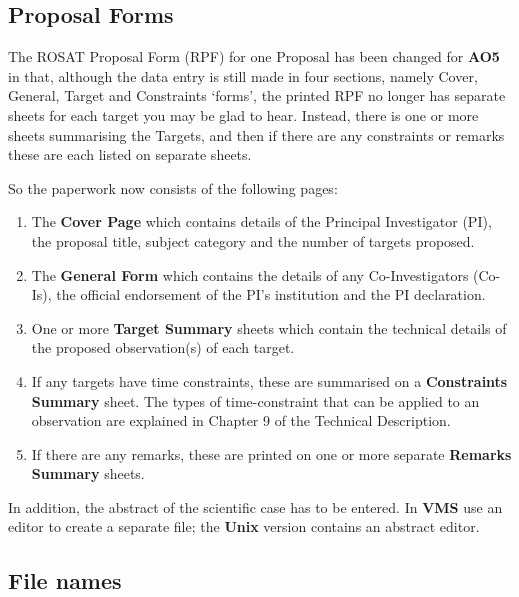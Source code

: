 \subsection{Proposal Forms}
\label{sse:forms}

The ROSAT Proposal Form (RPF) for one Proposal has been changed for
{\bf AO5} in that, although the data entry is still made in four
sections, namely Cover, General, Target and Constraints `forms', the
printed RPF no longer has separate sheets for each target you may be
glad to hear. Instead, there is one or more sheets summarising the
Targets, and then if there are any constraints or remarks these are
each listed on separate sheets.

So the paperwork now consists of the following pages:

\begin{enumerate}

\item The {\bf Cover Page} which contains details of the Principal
Investigator (PI), the proposal title, subject category and the number
of targets proposed.  \item The {\bf General Form} which contains the
details of any Co-Investigators (Co-Is), the official endorsement of
the PI's institution and the PI declaration.

\item One or more {\bf Target Summary} sheets which contain the
technical details of the proposed observation(s) of each target.

\item If any targets have time constraints, these are summarised on a
{\bf Constraints Summary} sheet. The types of time-constraint that can
be applied to an observation are explained in Chapter 9 of the
Technical Description.

\item If there are any remarks, these are printed on one or more separate 
{\bf Remarks Summary} sheets.

\end{enumerate}

In addition, the abstract of the scientific case has to be entered.  In
{\bf VMS} use an editor to create a separate file; the {\bf Unix}
version contains an abstract editor.

\subsection{File names}

